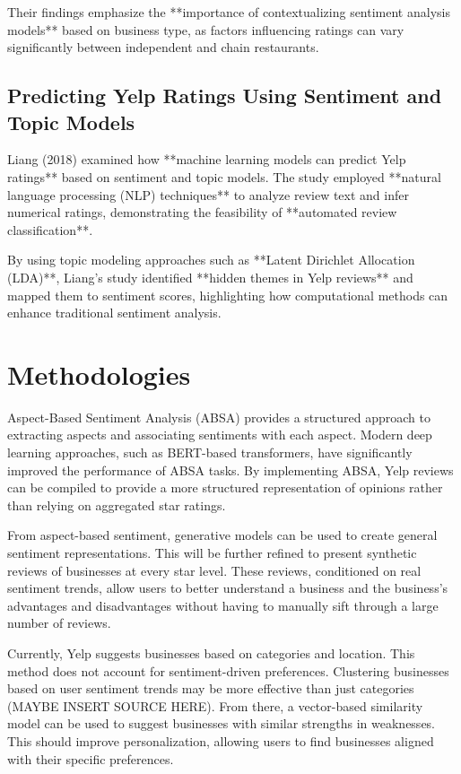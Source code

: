 \documentclass{article}
\begin{document}
Their findings emphasize the **importance of contextualizing sentiment analysis models** based on business type, as factors influencing ratings can vary significantly between independent and chain restaurants.

\subsection{Predicting Yelp Ratings Using Sentiment and Topic Models}

Liang (2018)\cite{Liang2018} examined how **machine learning models can predict Yelp ratings** based on sentiment and topic models. The study employed **natural language processing (NLP) techniques** to analyze review text and infer numerical ratings, demonstrating the feasibility of **automated review classification**.

By using topic modeling approaches such as **Latent Dirichlet Allocation (LDA)**, Liang's study identified **hidden themes in Yelp reviews** and mapped them to sentiment scores, highlighting how computational methods can enhance traditional sentiment analysis.

\section{Methodologies}
Aspect-Based Sentiment Analysis (ABSA) provides a structured approach to extracting aspects and associating sentiments with each aspect.  Modern deep learning approaches, such as BERT-based transformers, have significantly improved the performance of ABSA tasks.  By implementing ABSA, Yelp reviews can be compiled to provide a more structured representation of opinions rather than relying on aggregated star ratings.

From aspect-based sentiment, generative models can be used to create general sentiment representations.  This will be further refined to present synthetic reviews of businesses at every star level.  These reviews, conditioned on real sentiment trends, allow users to better understand a business and the business's advantages and disadvantages without having to manually sift through a large number of reviews.

Currently, Yelp suggests businesses based on categories and location.  This method does not account for sentiment-driven preferences.  Clustering businesses based on user sentiment trends may be more effective than just categories (MAYBE INSERT SOURCE HERE).  From there, a vector-based similarity model can be used to suggest businesses with similar strengths in weaknesses.  This should improve personalization, allowing users to find businesses aligned with their specific preferences.
\end{document}
